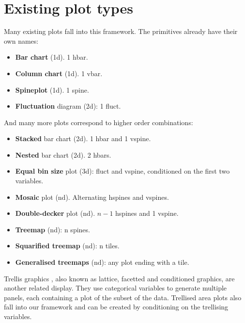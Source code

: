 \documentclass[journal]{vgtc}
\begin{document}
\section{Existing plot types}
\label{sec:existing}

Many existing plots fall into this framework. The primitives already have their own names:

\begin{itemize}
  \setlength{\itemsep}{0em}
  \item {\bf Bar chart} (1d). 1 hbar.
  \item {\bf Column chart} (1d). 1 vbar.
  \item {\bf Spineplot} (1d). 1 spine.
  \item {\bf Fluctuation} diagram (2d): 1 fluct.
\end{itemize}

\noindent And many more plots correspond to higher order combinations:

\begin{itemize}
  \setlength{\itemsep}{0em}
  
  \item {\bf Stacked} bar chart (2d). 1 hbar and 1 vspine.

  \item {\bf Nested} bar chart \citep{peltier:2009} (2d).  2 hbars. 

  \item {\bf Equal bin size} \citep{hofmann:2000} plot (3d): fluct and vspine, conditioned on the first two variables.

  \item {\bf Mosaic} plot \citep{hartigan:1981,friendly:1994,hofmann:2003} (nd). Alternating hspines and vspines. 

  \item {\bf Double-decker} plot \citep{hofmann:2001} (nd). $n-1$ hspines and 1 vspine. 

  \item {\bf Treemap} \citep{shneiderman:1992} (nd): n spines.

  \item {\bf Squarified treemap} \citep{bruls:1999} (nd): n tiles. 

  \item {\bf Generalised treemaps} \citep{vliegen:2006} (nd): any plot ending with a tile.

\end{itemize}

Trellis graphics \citep{becker:1996}, also known as lattice, facetted and conditioned graphics, are another related display. They use categorical variables to generate multiple panels, each containing a plot of the subset of the data. Trellised area plots also fall into our framework and can be created by conditioning on the trellising variables.
\end{document}
